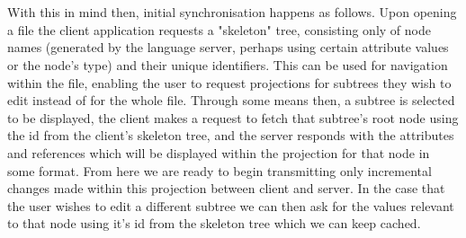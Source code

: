 \documentclass{article}
\begin{document}
\\
\\
With this in mind then, initial synchronisation happens as follows. Upon opening a file the client application requests a "skeleton" tree, consisting only of node names (generated by the language server, perhaps using certain attribute values or the node's type) and their unique identifiers. This can be used for navigation within the file, enabling the user to request projections for subtrees they wish to edit instead of for the whole file. Through some means then, a subtree is selected to be displayed, the client makes a request to fetch that subtree's root node using the id from the client's skeleton tree, and the server responds with the attributes and references which will be displayed within the projection for that node in some format. From here we are ready to begin transmitting only incremental changes made within this projection between client and server. In the case that the user wishes to edit a different subtree we can then ask for the values relevant to that node using it's id from the skeleton tree which we can keep cached.
\end{document}
